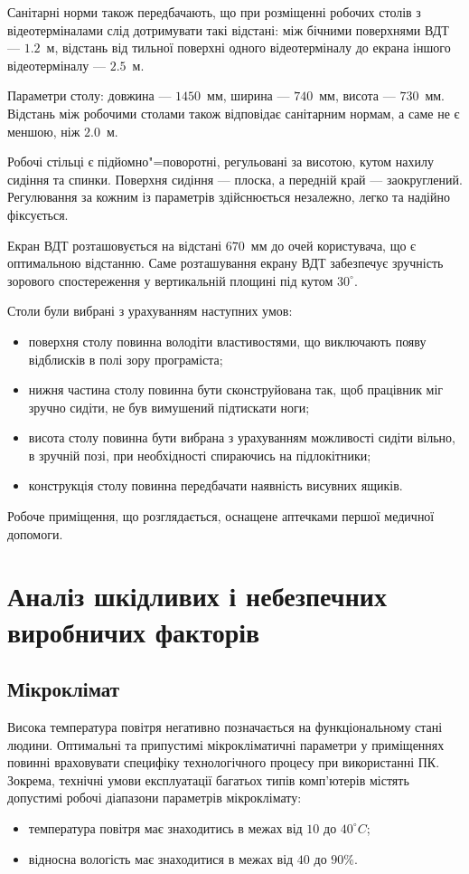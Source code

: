\documentclass{diploma}
\begin{document}
    Санітарні норми також передбачають, що при розміщенні робочих столів з
    відеотерміналами слід дотримувати такі відстані: між бічними поверхнями
    ВДТ --- $1.2$~м, відстань від тильної поверхні одного відеотерміналу до
    екрана іншого відеотерміналу --- $2.5$~м.

    Параметри столу: довжина --- $1450$~мм, ширина --- $740$~мм, висота ---
    $730$~мм.
    Відстань між робочими столами також відповідає санітарним нормам, а саме
    не є меншою, ніж $2.0$~м.

    Робочі стільці є підйомно"=поворотні, регульовані за висотою, кутом нахилу
    сидіння та спинки.
    Поверхня сидіння --- плоска, а передній край --- заокруглений.
    Регулювання за кожним із параметрів здійснюється незалежно, легко та
    надійно фіксується.

    Екран ВДТ розташовується на відстані $670$~мм до очей користувача, що
    є оптимальною відстанню.
    Саме розташування екрану ВДТ забезпечує зручність зорового спостереження у
    вертикальній площині під кутом $30^\circ$.

    Столи були вибрані з урахуванням наступних умов:
    \begin{itemize}
      \item поверхня столу повинна володіти властивостями, що виключають появу
        відблисків в полі зору програміста;
      \item нижня частина столу повинна бути сконструйована так, щоб працівник
        міг зручно сидіти, не був вимушений підтискати ноги;
      \item висота столу повинна бути вибрана з урахуванням можливості сидіти
        вільно, в зручній позі, при необхідності спираючись на підлокітники;
      \item конструкція столу повинна передбачати наявність висувних ящиків.
    \end{itemize}

    Робоче приміщення, що розглядається, оснащене аптечками першої медичної
    допомоги.
    \clearpage

  \section{Аналіз шкідливих і небезпечних виробничих факторів}
    \subsection{Мікроклімат}
      Висока температура повітря негативно позначається на функціональному
      стані людини.
      Оптимальні та припустимі мікрокліматичні параметри у приміщеннях повинні
      враховувати специфіку технологічного процесу при використанні ПК.
      Зокрема, технічні умови експлуатації багатьох типів комп’ютерів містять
      допустимі робочі діапазони параметрів мікроклімату:
      \begin{itemize}
        \item температура повітря має знаходитись в межах від $10$ до
          $40^\circ C$;
        \item відносна вологість має знаходитися в межах від $40$ до $90\%$.
      \end{itemize}
\end{document}
